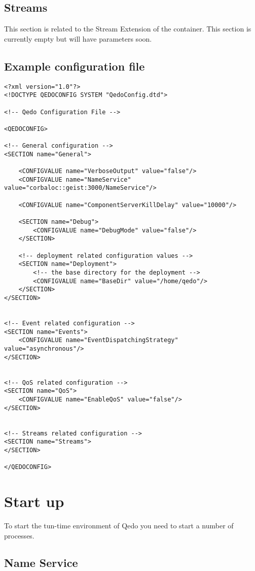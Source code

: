\documentclass[12pt,a4paper]{report}
\begin{document}
\subsection{Streams}
\label{Streams}
This section is related to the Stream Extension of the container. This section is currently empty but will have parameters soon.

\subsection{Example configuration file}
\label{example}
\begin{verbatim}
<?xml version="1.0"?>
<!DOCTYPE QEDOCONFIG SYSTEM "QedoConfig.dtd">

<!-- Qedo Configuration File -->

<QEDOCONFIG>

<!-- General configuration -->
<SECTION name="General">

	<CONFIGVALUE name="VerboseOutput" value="false"/>
	<CONFIGVALUE name="NameService" value="corbaloc::geist:3000/NameService"/>

	<CONFIGVALUE name="ComponentServerKillDelay" value="10000"/>

	<SECTION name="Debug">
		<CONFIGVALUE name="DebugMode" value="false"/>
	</SECTION>

	<!-- deployment related configuration values -->
	<SECTION name="Deployment">
		<!-- the base directory for the deployment -->
		<CONFIGVALUE name="BaseDir" value="/home/qedo"/>
	</SECTION>
</SECTION>

	
<!-- Event related configuration -->
<SECTION name="Events">
	<CONFIGVALUE name="EventDispatchingStrategy" value="asynchronous"/>
</SECTION>

	
<!-- QoS related configuration -->
<SECTION name="QoS">
	<CONFIGVALUE name="EnableQoS" value="false"/>
</SECTION>


<!-- Streams related configuration -->
<SECTION name="Streams">
</SECTION>

</QEDOCONFIG>

\end{verbatim}


\section{Start up}
\label{sec:StartUp}
To start the tun-time environment of Qedo you need to start a number of processes. 

\subsection{Name Service}
\label{sec:NameService}
\end{document}
